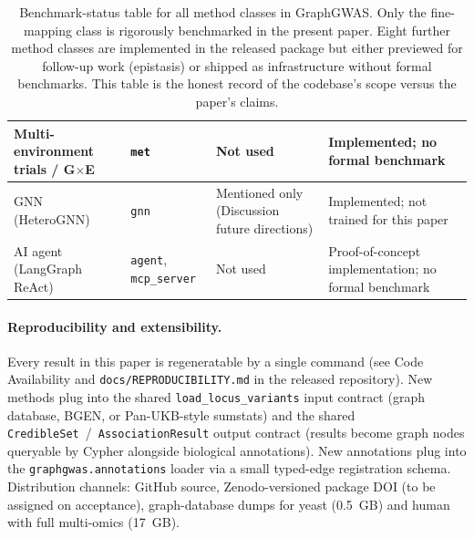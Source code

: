 \begin{table}[htbp]
\begin{tabular}{p{}p{}p{}p{}}
\midrule
Multi-environment trials / G$\times$E & \texttt{met} & Not used & Implemented; no formal benchmark \\
\midrule
GNN (HeteroGNN) & \texttt{gnn} & Mentioned only (Discussion future directions) & Implemented; not trained for this paper \\
\midrule
AI agent (LangGraph ReAct) & \texttt{agent},\,\texttt{mcp\_server} & Not used & Proof-of-concept implementation; no formal benchmark \\
\bottomrule
\end{tabular}
\caption{Benchmark-status table for all method classes in
GraphGWAS. Only the fine-mapping class is rigorously benchmarked
in the present paper. Eight further method classes are implemented
in the released package but either previewed for follow-up work
(epistasis) or shipped as infrastructure without formal
benchmarks. This table is the honest record of the codebase's
scope versus the paper's claims.}
\label{tab:sup_benchmark_status}
\end{table}

\paragraph{Reproducibility and extensibility.}
Every result in this paper is regeneratable by a single command
(see Code Availability and \texttt{docs/REPRODUCIBILITY.md} in the
released repository). New methods plug into the shared
\texttt{load\_locus\_variants} input contract (graph database, BGEN,
or Pan-UKB-style sumstats) and the shared
\texttt{CredibleSet}~/~\texttt{AssociationResult} output contract
(results become graph nodes queryable by Cypher alongside
biological annotations). New annotations plug into the
\texttt{graphgwas.annotations} loader via a small typed-edge
registration schema. Distribution channels: GitHub source,
Zenodo-versioned package DOI (to be assigned on acceptance),
graph-database dumps for yeast (0.5~GB) and human with full
multi-omics (17~GB).

